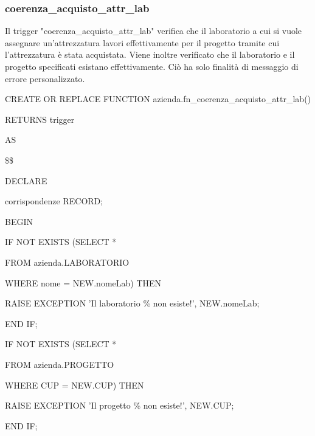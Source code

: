     \subsubsection{coerenza\_acquisto\_attr\_lab}
    Il trigger "coerenza\_acquisto\_attr\_lab" verifica che il laboratorio a cui si vuole assegnare un'attrezzatura lavori effettivamente per il progetto tramite cui l'attrezzatura è stata acquistata. Viene inoltre verificato che il laboratorio e il progetto specificati esistano effettivamente. Ciò ha solo finalità di messaggio di errore personalizzato.
    \ttfamily
        \begin{flushleft}
            \begin{description}
                \item CREATE OR REPLACE FUNCTION azienda.fn\_coerenza\_acquisto\_attr\_lab()  
                \item RETURNS trigger
                \item AS
                \item \$\$
                \item DECLARE
                \begin{description}
                    \item corrispondenze RECORD;
                \end{description}
                \item BEGIN 
                \begin{description}
                    \item IF NOT EXISTS (SELECT *
                    \item FROM azienda.LABORATORIO
                    \item WHERE nome = NEW.nomeLab) THEN
                    \begin{description}
                        \item RAISE EXCEPTION 'Il laboratorio \% non esiste!', NEW.nomeLab;
                    \end{description}
                    \item END IF;
                    
                    \vspace{0.5cm}
                
                    \item IF NOT EXISTS (SELECT *
                    \item FROM azienda.PROGETTO
                    \item WHERE CUP = NEW.CUP) THEN
                    \begin{description}
                        \item RAISE EXCEPTION 'Il progetto \% non esiste!', NEW.CUP;
                    \end{description}
                    \item END IF;
                

\end{description}
\end{description}
\end{flushleft}
